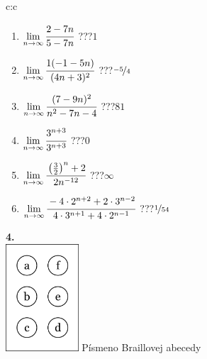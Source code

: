 \documentclass[10pt]{report}
\begin{document}
\begin{tabular}{c:c}
\begin{minipage}[c][104.5mm][t]{0.5\linewidth}
\begin{center}
\begin{minipage}{0.79\linewidth}
\begin{center}
\begin{varwidth}{\linewidth}
\begin{enumerate}
\normalsize
\item $\lim\limits_{n\to\infty}\cfrac{2-7n}{5-7n}$\quad \dotfill\; ???\;\dotfill \quad $1$
\item $\lim\limits_{n\to\infty}\cfrac{1(-1-5n)}{(4n+3)^2}$\quad \dotfill\; ???\;\dotfill \quad $\nicefrac{-5}{4}$
\item $\lim\limits_{n\to\infty}\cfrac{(7-9n)^2}{n^2-7n-4}$\quad \dotfill\; ???\;\dotfill \quad $81$
\item $\lim\limits_{n\to\infty}\cfrac{3^{n+3}}{3^{n+3}}$\quad \dotfill\; ???\;\dotfill \quad $0$
\item $\lim\limits_{n\to\infty}\cfrac{\left(\frac{3}{2}\right)^n +2}{2n^{-12}}$\quad \dotfill\; ???\;\dotfill \quad $\infty$
\item $\lim\limits_{n\to\infty}\cfrac{-4\cdot 2^{n+2}+2\cdot 3^{n-2}}{4\cdot 3^{n+1}+4\cdot 2^{n-1}}$\quad \dotfill\; ???\;\dotfill \quad $\nicefrac{1}{54}$
\end{enumerate}
\end{varwidth}
\end{center}
\end{minipage}
\begin{minipage}{0.20\linewidth}
\begin{center}
{\Huge\bfseries 4.} \\[2mm]
\includegraphics[height=40mm]{../images/braille.png}
{\small Písmeno Braillovej abecedy}
\end{center}
\end{minipage}
\end{center}
\end{minipage}
%
\end{tabular}
\newpage
\thispagestyle{empty}
\end{document}
